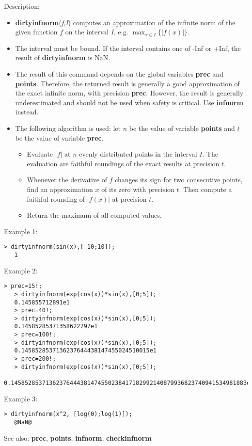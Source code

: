 \noindent Description: \begin{itemize}

\item \textbf{dirtyinfnorm}(\emph{f},\emph{I}) computes an approximation of the infinite norm of the 
   given function $f$ on the interval $I$, e.g. $\max_{x \in I} \{|f(x)|\}$.

\item The interval must be bound. If the interval contains one of -Inf or +Inf, the 
   result of \textbf{dirtyinfnorm} is NaN.

\item The result of this command depends on the global variables \textbf{prec} and \textbf{points}.
   Therefore, the returned result is generally a good approximation of the exact
   infinite norm, with precision \textbf{prec}. However, the result is generally 
   underestimated and should not be used when safety is critical.
   Use \textbf{infnorm} instead.

\item The following algorithm is used: let $n$ be the value of variable \textbf{points}
   and $t$ be the value of variable \textbf{prec}.
   \begin{itemize}
   \item  Evaluate $|f|$ at $n$ evenly distributed points in the
     interval $I$. The evaluation are faithful roundings of the exact
     results at precision $t$.
   \item  Whenever the derivative of $f$ changes its sign for two consecutive 
     points, find an approximation $x$ of its zero with precision $t$.
     Then compute a faithful rounding of $|f(x)|$ at precision $t$.
   \item  Return the maximum of all computed values.
   \end{itemize}
\end{itemize}
\noindent Example 1: 
\begin{center}\begin{minipage}{14.8cm}\begin{Verbatim}[frame=single]
   > dirtyinfnorm(sin(x),[-10;10]);
   1
\end{Verbatim}
\end{minipage}\end{center}
\noindent Example 2: 
\begin{center}\begin{minipage}{14.8cm}\begin{Verbatim}[frame=single]
   > prec=15!;
   > dirtyinfnorm(exp(cos(x))*sin(x),[0;5]);
   0.145855712891e1
   > prec=40!;
   > dirtyinfnorm(exp(cos(x))*sin(x),[0;5]);
   0.14585285371358622797e1
   > prec=100!;
   > dirtyinfnorm(exp(cos(x))*sin(x),[0;5]);
   0.1458528537136237644438147455024510015e1
   > prec=200!;
   > dirtyinfnorm(exp(cos(x))*sin(x),[0;5]);
   0.14585285371362376444381474550238417182992140879936823740941534981883e1
\end{Verbatim}
\end{minipage}\end{center}
\noindent Example 3: 
\begin{center}\begin{minipage}{14.8cm}\begin{Verbatim}[frame=single]
   > dirtyinfnorm(x^2, [log(0);log(1)]);
   @NaN@
\end{Verbatim}
\end{minipage}\end{center}
See also: \textbf{prec}, \textbf{points}, \textbf{infnorm}, \textbf{checkinfnorm}
